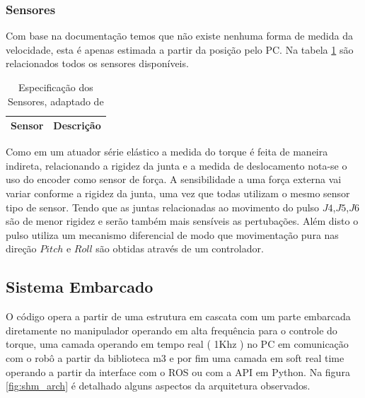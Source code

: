 
\subsubsection{Sensores}


Com base na documentação temos que não existe nenhuma forma de medida da velocidade, esta é apenas estimada a partir da posição pelo PC. Na tabela \ref{tab:a2armSensorDoc} são relacionados todos os sensores disponíveis.


\begin{table}[H]
    \centering
    \caption{Especificação dos Sensores, adaptado de \cite{mekaguide}}
    \begin{tabular}{ll}
         \hline
         Sensor & Descrição\\
         \hline
         
         \hline
    \end{tabular}
    \label{tab:a2armSensorDoc}
\end{table}

Como em um atuador série elástico a medida do torque é feita de maneira indireta, relacionando a rigidez da junta e a medida de deslocamento nota-se o uso do encoder como sensor de força. A sensibilidade a uma força externa vai variar conforme a rigidez da junta, uma vez que todas utilizam o mesmo sensor tipo de sensor. Tendo que as juntas relacionadas ao movimento do pulso $J4$,$J5$,$J6$ são de menor rigidez e serão também mais sensíveis as pertubações. Além disto o pulso utiliza um mecanismo diferencial de modo que movimentação pura nas direção $Pitch$ e $Roll$ são obtidas através de um controlador.

\subsection{Sistema Embarcado}


O código opera a partir de uma estrutura em cascata com um parte embarcada diretamente no manipulador operando em alta frequência para o controle do torque, uma camada operando em tempo real ( 1Khz ) no PC em comunicação com o robô a partir da biblioteca m3 e por fim uma camada em soft real time operando a partir da interface com o ROS ou com a API em Python. Na figura \ref{fig:shm_arch} é detalhado alguns aspectos da arquitetura observados.

